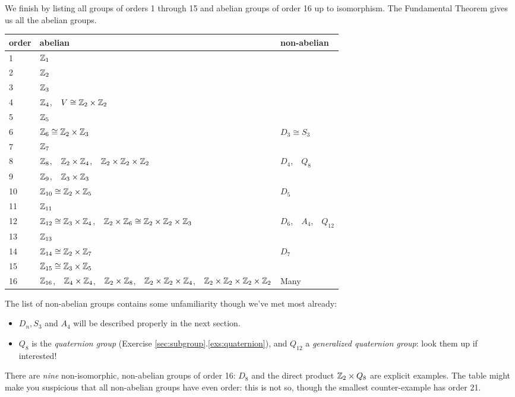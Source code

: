 We finish by listing all groups of orders 1 through 15 and abelian groups of order 16 up to isomorphism. The Fundamental Theorem gives us all the abelian groups.\par
\begin{center}\label{pg:fundabel}
\begin{tabular}{|l|l|l|}
\hline
order & abelian & non-abelian\\
\hline
1 & $\mathbb{Z}_1$ & \\
2 & $\mathbb{Z}_2$ & \\
3 & $\mathbb{Z}_3$ & \\
4 & $\mathbb{Z}_4$,\ \ $V\cong\mathbb{Z}_2\times\mathbb{Z}_2$ & \\
\hline
5 & $\mathbb{Z}_5$ & \\
6 & $\mathbb{Z}_6\cong\mathbb{Z}_2\times\mathbb{Z}_3$ & $D_3\cong S_3$\\
7 & $\mathbb{Z}_7$ & \\
8 & $\mathbb{Z}_8$,\ \ $\mathbb{Z}_2\times\mathbb{Z}_4$,\ \ $\mathbb{Z}_2\times\mathbb{Z}_2\times\mathbb{Z}_2$ & $D_4$,\ \ $Q_8$\\
\hline
9 & $\mathbb{Z}_9$,\ \ $\mathbb{Z}_3\times\mathbb{Z}_3$ & \\
10 & $\mathbb{Z}_{10}\cong\mathbb{Z}_2\times\mathbb{Z}_5$ & $D_5$\\
11 & $\mathbb{Z}_{11}$ & \\
12 & $\mathbb{Z}_{12}\cong\mathbb{Z}_3\times\mathbb{Z}_4$,\ \ $\mathbb{Z}_2\times\mathbb{Z}_6\cong\mathbb{Z}_2\times\mathbb{Z}_2\times\mathbb{Z}_3$ & $D_6$,\ \ $A_4$,\ \ $Q_{12}$\\
\hline
13 & $\mathbb{Z}_{13}$ & \\
14 & $\mathbb{Z}_{14}\cong\mathbb{Z}_2\times\mathbb{Z}_7$ & $D_7$\\
15 & $\mathbb{Z}_{15}\cong\mathbb{Z}_3\times\mathbb{Z}_5$ & \\
16 & $\mathbb{Z}_{16}$,\ \ $\mathbb{Z}_4\times\mathbb{Z}_4$,\ \ $\mathbb{Z}_2\times\mathbb{Z}_8$,\ \ $\mathbb{Z}_2\times\mathbb{Z}_2\times\mathbb{Z}_4$,\ \ $\mathbb{Z}_2\times\mathbb{Z}_2\times\mathbb{Z}_2\times\mathbb{Z}_2$ & Many\\
\hline
\end{tabular}
\end{center}

The list of non-abelian groups contains some unfamiliarity though we've met most already:
\begin{itemize}\itemsep0pt
  \item $D_n,S_3$ and $A_4$ will be described properly in the next section.
  \item $Q_8$ is the \emph{quaternion group} (Exercise \ref*{sec:subgroup}.\ref{exs:quaternion}), and $Q_{12}$ a \emph{generalized quaternion group}: look them up if interested!
\end{itemize}
There are \emph{nine} non-isomorphic, non-abelian groups of order 16: $D_8$ and the direct product $\mathbb{Z}_2\times Q_8$ are explicit examples. The table might make you suspicious that all non-abelian groups have even order: this is not so, though the smallest counter-example has order 21.



